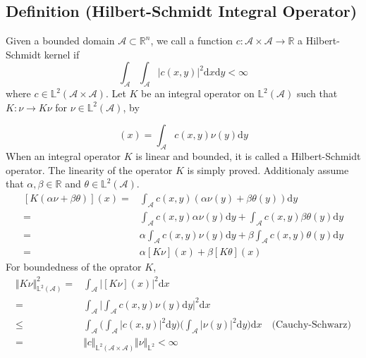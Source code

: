 \documentclass[11pt,twoside,a4paper]{article}
\begin{document}
	\subsection{Definition (Hilbert-Schmidt Integral Operator)}\label{def_HS}
	Given a bounded domain $\mathcal{A} \subset \mathbb{R}^n$, we call a function $c : \mathcal{A} \times \mathcal{A} \rightarrow \mathbb{R}$ a Hilbert-Schmidt kernel if
	\begin{equation}
		\int_{\mathcal{A}} \int_{\mathcal{A}} \vert c(x,y) \vert ^2 \mathrm{d}x \mathrm{d}y < \infty
	\end{equation}
	where $c \in \mathbb{L}^2(\mathcal{A} \times \mathcal{A})$. Let $K$ be an integral operator on $\mathbb{L}^2(\mathcal{A})$ such that $K : \nu \rightarrow K \nu$ for $\nu \in \mathbb{L}^2(\mathcal{A})$, by
	
	\begin{equation}
		[K\nu](x) = \int_{\mathcal{A}} c(x,y) \nu(y) \mathrm{d}y
	\end{equation}
	When an integral operator $K$ is linear and bounded, it is called a Hilbert-Schmidt operator. The linearity of the operator $K$ is simply proved. Additionaly assume that $\alpha, \beta \in \mathbb{R}$ and $\theta \in \mathbb{L}^2(\mathcal{A})$.
	\begin{equation}
		\begin{split}
			[K (\alpha \nu + \beta \theta)](x) =& \int_{\mathcal{A}} c(x,y)(\alpha \nu(y) + \beta \theta(y)) \mathrm{d}y\\
			= & \int_{\mathcal{A}} c(x,y) \alpha \nu(y) \mathrm{d}y + \int_{\mathcal{A}} c(x,y) \beta \theta(y) \mathrm{d}y\\
			= & \alpha\int_{\mathcal{A}} c(x,y) \nu (y) \mathrm{d}y + \beta\int_{\mathcal{A}} c(x,y) \theta (y) \mathrm{d}y\\
			= & \alpha[K\nu](x) + \beta[K\theta](x)
		\end{split}
	\end{equation}
	For boundedness of the oprator $K$,
	\begin{equation}
		\begin{split}
			\Vert K\nu \Vert^{2}_{\mathbb{L}^2(\mathcal{A})} = & \int_{\mathcal{A}} \biggl\vert [K\nu](x) \biggr\vert^2 \mathrm{d}x\\
			= &\int_{\mathcal{A}} \biggl\vert \int_{\mathcal{A}}c(x,y)\nu(y)\mathrm{d}y \biggr\vert^2\mathrm{d}x\\
			\leq & \int_{\mathcal{A}}\biggl(\int_{\mathcal{A}}\vert c(x,y) \vert^2\mathrm{d}y\biggr) \biggl(\int_{\mathcal{A}}\vert \nu(y) \vert ^2 \mathrm{d}y \biggr)\mathrm{d}x \quad \text{(Cauchy-Schwarz)}\\
			= & \Vert c \Vert_{\mathbb{L}^2(\mathcal{A} \times \mathcal{A})}\Vert \nu \Vert_{\mathbb{L}^2} < \infty
		\end{split}
	\end{equation}
	
\end{document}
